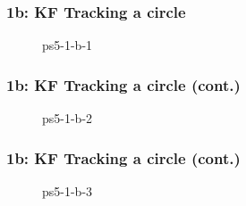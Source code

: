 \documentclass[../report.tex]{subfiles}
\begin{document}
    \begin{frame}
        \frametitle{1b: KF Tracking a circle}
        \begin{figure}[!htb]
            \centering
            \caption{ps5-1-b-1} 
        \end{figure}
    \end{frame}

    \begin{frame}
        \frametitle{1b: KF Tracking a circle (cont.)}
        \begin{figure}[!htb]
            \centering
            \caption{ps5-1-b-2} 
        \end{figure}
    \end{frame}

    \begin{frame}
        \frametitle{1b: KF Tracking a circle (cont.)}
        \begin{figure}[!htb]
            \centering
            \caption{ps5-1-b-3} 
        \end{figure}
    \end{frame}
\end{document}
